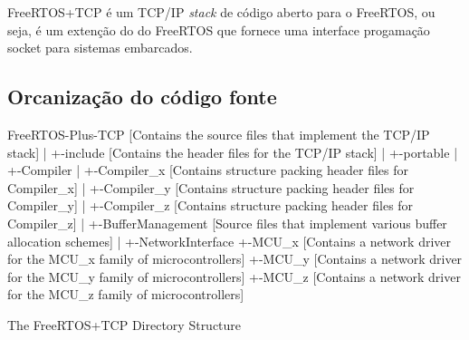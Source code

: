 FreeRTOS+TCP é um TCP/IP \textit{stack} de código aberto para o FreeRTOS, ou seja, é um extenção do do FreeRTOS que fornece uma interface progamação 
socket para sistemas embarcados.

\subsection{Orcanização do código fonte}

FreeRTOS-Plus-TCP        [Contains the source files that implement the TCP/IP stack]
  |
  +-include              [Contains the header files for the TCP/IP stack]
  |
  +-portable
      |
      +-Compiler
      |   +-Compiler_x   [Contains structure packing header files for Compiler_x]
      |   +-Compiler_y   [Contains structure packing header files for Compiler_y]
      |   +-Compiler_z   [Contains structure packing header files for Compiler_z]
      |
      +-BufferManagement [Source files that implement various buffer allocation schemes]
      |
      +-NetworkInterface
          +-MCU_x        [Contains a network driver for the MCU_x family of microcontrollers]
          +-MCU_y        [Contains a network driver for the MCU_y family of microcontrollers]
          +-MCU_z        [Contains a network driver for the MCU_z family of microcontrollers]

The FreeRTOS+TCP Directory Structure